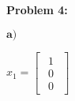 \textbf{Problem 4:}

\singlespacing

$\textbf{a)}$

\singlespacing

\begin{math}
    x_1 = \begin{bmatrix}
        \begin{array}{c}
            1 \\
            0 \\
            0
        \end{array}
    \end{bmatrix}
\end{math}